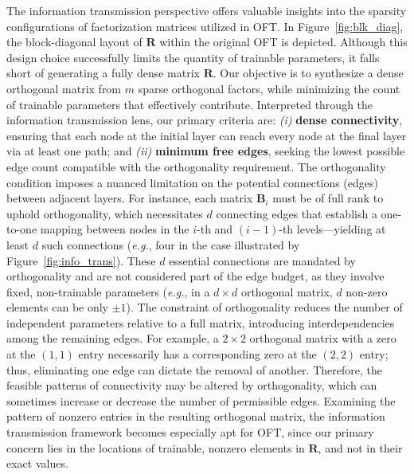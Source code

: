 The information transmission perspective offers valuable insights into the sparsity configurations of factorization matrices utilized in OFT. In Figure~\ref{fig:blk_diag}, the block-diagonal layout of $\bm{R}$ within the original OFT is depicted. Although this design choice successfully limits the quantity of trainable parameters, it falls short of generating a fully dense matrix $\bm{R}$. Our objective is to synthesize a dense orthogonal matrix from $m$ sparse orthogonal factors, while minimizing the count of trainable parameters that effectively contribute. Interpreted through the information transmission lens, our primary criteria are: \emph{(i)} \textbf{dense connectivity}, ensuring that each node at the initial layer can reach every node at the final layer via at least one path; and \emph{(ii)} \textbf{minimum free edges}, seeking the lowest possible edge count compatible with the orthogonality requirement. The orthogonality condition imposes a nuanced limitation on the potential connections (edges) between adjacent layers. For instance, each matrix $\bm{B}_i$ must be of full rank to uphold orthogonality, which necessitates $d$ connecting edges that establish a one-to-one mapping between nodes in the $i$-th and $(i-1)$-th levels—yielding at least $d$ such connections (\emph{e.g.}, four in the case illustrated by Figure~\ref{fig:info_trans}). These $d$ essential connections are mandated by orthogonality and are not considered part of the edge budget, as they involve fixed, non-trainable parameters (\emph{e.g.}, in a $d \times d$ orthogonal matrix, $d$ non-zero elements can be only $\pm 1$). The constraint of orthogonality reduces the number of independent parameters relative to a full matrix, introducing interdependencies among the remaining edges. For example, a $2 \times 2$ orthogonal matrix with a zero at the $(1,1)$ entry necessarily has a corresponding zero at the $(2,2)$ entry; thus, eliminating one edge can dictate the removal of another. Therefore, the feasible patterns of connectivity may be altered by orthogonality, which can sometimes increase or decrease the number of permissible edges. Examining the pattern of nonzero entries in the resulting orthogonal matrix, the information transmission framework becomes especially apt for OFT, since our primary concern lies in the locations of trainable, nonzero elements in $\bm{R}$, and not in their exact values.

